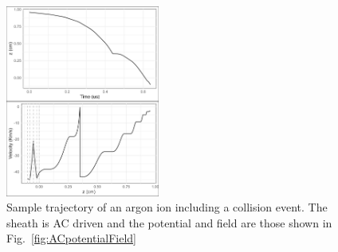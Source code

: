 \begin{figure}[htbp]
\centering
\includegraphics[width=0.45\textwidth]{Figures/ionTrajectory0.5Pa13.56MHz2kVStack2332.jpeg}
\caption{Sample trajectory of an argon ion including a collision event. The sheath is AC driven and the potential and field are those shown in Fig.~\ref{fig:ACpotentialField} }
\label{fig:CollisionACtrajectory}
\end{figure}

